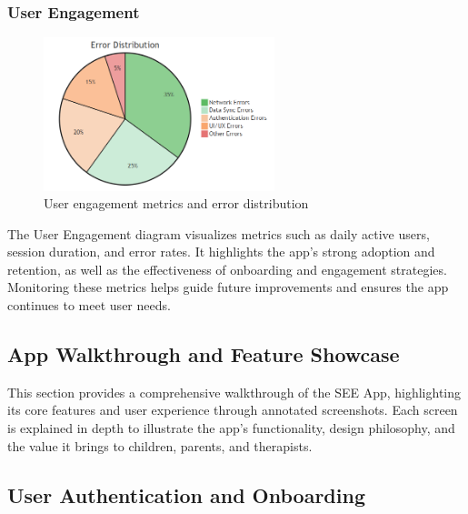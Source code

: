 ﻿\documentclass[12pt,a4paper]{article}
\newcommand{\sectiontitle}[1]{\subsection{#1}}
\newcommand{\subsectiontitle}[1]{\subsubsection{#1}}
\begin{document}
\subsectiontitle{User Engagement}

\begin{figure}[H]
    \centering
    \includegraphics[width=0.6\textwidth,height=0.14\textwidth,keepaspectratio]{redrawn_diagrams/Figure10_User_Engagement.png}
    \caption{User engagement metrics and error distribution}
    \label{fig:user-engagement}
\end{figure}
\vspace{0.5em}
The User Engagement diagram visualizes metrics such as daily active users, session duration, and error rates. It highlights the app's strong adoption and retention, as well as the effectiveness of onboarding and engagement strategies. Monitoring these metrics helps guide future improvements and ensures the app continues to meet user needs.

\newpage

\sectiontitle{App Walkthrough and Feature Showcase}

This section provides a comprehensive walkthrough of the SEE App, highlighting its core features and user experience through annotated screenshots. Each screen is explained in depth to illustrate the app's functionality, design philosophy, and the value it brings to children, parents, and therapists.

\sectiontitle{User Authentication and Onboarding}
\end{document}
